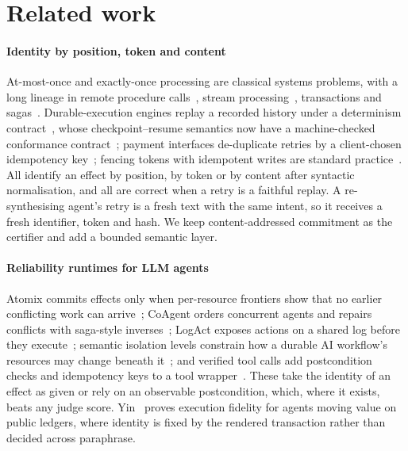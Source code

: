 \section{Related work}\label{sec:related}

\paragraph{Identity by position, token and content}
At-most-once and exactly-once processing are classical systems problems, with a long lineage in remote procedure calls~\cite{birrell1984rpc}, stream processing~\cite{carbone2017flink}, transactions and sagas~\cite{gray1993transaction,garcia1987sagas}. Durable-execution engines replay a recorded history under a determinism contract~\cite{temporal2026docs,restate2026docs}, whose checkpoint--resume semantics now have a machine-checked conformance contract~\cite{resume2026contract}; payment interfaces de-duplicate retries by a client-chosen idempotency key~\cite{stripe2026idempotency}; fencing tokens with idempotent writes are standard practice~\cite{kleppmann2017ddia}. All identify an effect by position, by token or by content after syntactic normalisation, and all are correct when a retry is a faithful replay. A re-synthesising agent's retry is a fresh text with the same intent, so it receives a fresh identifier, token and hash. We keep content-addressed commitment as the certifier and add a bounded semantic layer.

\paragraph{Reliability runtimes for LLM agents}
Atomix commits effects only when per-resource frontiers show that no earlier conflicting work can arrive~\cite{atomix2026}; CoAgent orders concurrent agents and repairs conflicts with saga-style inverses~\cite{lyu2026coagent}; LogAct exposes actions on a shared log before they execute~\cite{balakrishnan2026logact}; semantic isolation levels constrain how a durable AI workflow's resources may change beneath it~\cite{mozafari2026transaction}; and verified tool calls add postcondition checks and idempotency keys to a tool wrapper~\cite{mansoor2026verified}. These take the identity of an effect as given or rely on an observable postcondition, which, where it exists, beats any judge score. Yin~\cite{yin2026invariants} proves execution fidelity for agents moving value on public ledgers, where identity is fixed by the rendered transaction rather than decided across paraphrase.

